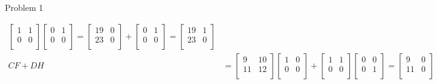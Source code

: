\begin{problem}{Problem 1}
\begin{highlight}[Solution]
\begin{align*}
\begin{bmatrix}
                1 & 1 \\
                0 & 0 \\
            \end{bmatrix}
            \begin{bmatrix}
                0 & 1 \\
                0 & 0 \\
            \end{bmatrix}
            = 
            \begin{bmatrix}
                19 & 0 \\
                23 & 0 \\
            \end{bmatrix}
            + 
            \begin{bmatrix}
                0 & 1 \\
                0 & 0 \\
            \end{bmatrix}
            =
            \begin{bmatrix}
                19 & 1 \\
                23 & 0 \\
            \end{bmatrix} \\
            CF + DH & =
            \begin{bmatrix}
                9 & 10 \\
                11 & 12 \\
            \end{bmatrix}
            \begin{bmatrix}
                1 & 0 \\
                0 & 0 \\
            \end{bmatrix}
            + 
            \begin{bmatrix}
                1 & 1 \\
                0 & 0 \\
            \end{bmatrix}
            \begin{bmatrix}
                0 & 0 \\
                0 & 1 \\
            \end{bmatrix}
            =
            \begin{bmatrix}
                9 & 0 \\
                11 & 0 \\

\end{bmatrix}
\end{align*}
\end{highlight}
\end{problem}
